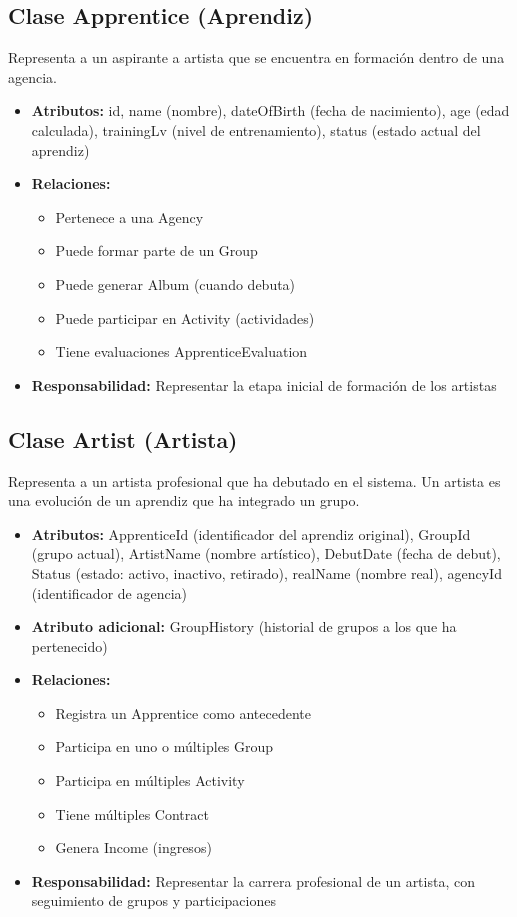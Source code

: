 \documentclass[12pt,a4paper,spanish,oneside]{report}
\begin{document}
\subsection{Clase Apprentice (Aprendiz)}
Representa a un aspirante a artista que se encuentra en formación dentro de una agencia.

\begin{itemize}
	\item \textbf{Atributos:} id, name (nombre), dateOfBirth (fecha de nacimiento), age (edad calculada), trainingLv (nivel de entrenamiento), status (estado actual del aprendiz)
	\item \textbf{Relaciones:}
	\begin{itemize}
		\item Pertenece a una Agency
		\item Puede formar parte de un Group
		\item Puede generar Album (cuando debuta)
		\item Puede participar en Activity (actividades)
		\item Tiene evaluaciones ApprenticeEvaluation
	\end{itemize}
	\item \textbf{Responsabilidad:} Representar la etapa inicial de formación de los artistas
\end{itemize}

\subsection{Clase Artist (Artista)}
Representa a un artista profesional que ha debutado en el sistema. Un artista es una evolución de un aprendiz que ha integrado un grupo.

\begin{itemize}
	\item \textbf{Atributos:} ApprenticeId (identificador del aprendiz original), GroupId (grupo actual), ArtistName (nombre artístico), DebutDate (fecha de debut), Status (estado: activo, inactivo, retirado), realName (nombre real), agencyId (identificador de agencia)
	\item \textbf{Atributo adicional:} GroupHistory (historial de grupos a los que ha pertenecido)
	\item \textbf{Relaciones:}
	\begin{itemize}
		\item Registra un Apprentice como antecedente
		\item Participa en uno o múltiples Group
		\item Participa en múltiples Activity
		\item Tiene múltiples Contract
		\item Genera Income (ingresos)
	\end{itemize}
	\item \textbf{Responsabilidad:} Representar la carrera profesional de un artista, con seguimiento de grupos y participaciones
\end{itemize}
\end{document}
